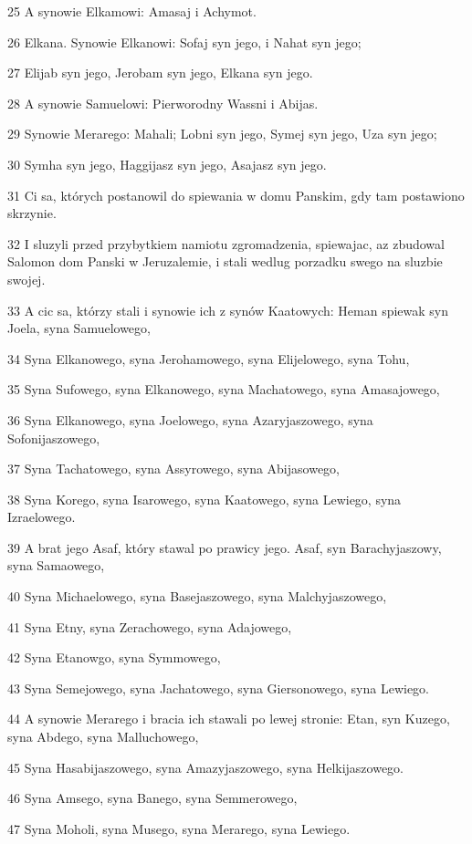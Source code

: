 \par 25 A synowie Elkamowi: Amasaj i Achymot.
\par 26 Elkana. Synowie Elkanowi: Sofaj syn jego, i Nahat syn jego;
\par 27 Elijab syn jego, Jerobam syn jego, Elkana syn jego.
\par 28 A synowie Samuelowi: Pierworodny Wassni i Abijas.
\par 29 Synowie Merarego: Mahali; Lobni syn jego, Symej syn jego, Uza syn jego;
\par 30 Symha syn jego, Haggijasz syn jego, Asajasz syn jego.
\par 31 Ci sa, których postanowil do spiewania w domu Panskim, gdy tam postawiono skrzynie.
\par 32 I sluzyli przed przybytkiem namiotu zgromadzenia, spiewajac, az zbudowal Salomon dom Panski w Jeruzalemie, i stali wedlug porzadku swego na sluzbie swojej.
\par 33 A cic sa, którzy stali i synowie ich z synów Kaatowych: Heman spiewak syn Joela, syna Samuelowego,
\par 34 Syna Elkanowego, syna Jerohamowego, syna Elijelowego, syna Tohu,
\par 35 Syna Sufowego, syna Elkanowego, syna Machatowego, syna Amasajowego,
\par 36 Syna Elkanowego, syna Joelowego, syna Azaryjaszowego, syna Sofonijaszowego,
\par 37 Syna Tachatowego, syna Assyrowego, syna Abijasowego,
\par 38 Syna Korego, syna Isarowego, syna Kaatowego, syna Lewiego, syna Izraelowego.
\par 39 A brat jego Asaf, który stawal po prawicy jego. Asaf, syn Barachyjaszowy, syna Samaowego,
\par 40 Syna Michaelowego, syna Basejaszowego, syna Malchyjaszowego,
\par 41 Syna Etny, syna Zerachowego, syna Adajowego,
\par 42 Syna Etanowgo, syna Symmowego,
\par 43 Syna Semejowego, syna Jachatowego, syna Giersonowego, syna Lewiego.
\par 44 A synowie Merarego i bracia ich stawali po lewej stronie: Etan, syn Kuzego, syna Abdego, syna Malluchowego,
\par 45 Syna Hasabijaszowego, syna Amazyjaszowego, syna Helkijaszowego.
\par 46 Syna Amsego, syna Banego, syna Semmerowego,
\par 47 Syna Moholi, syna Musego, syna Merarego, syna Lewiego.
